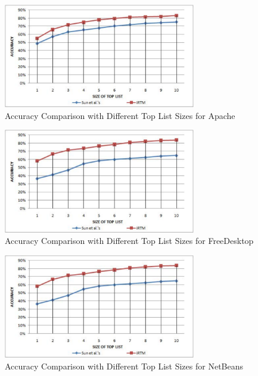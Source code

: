 \begin{figure}[t]
\centering
\includegraphics[width=3.3in]{apache}
\caption{Accuracy Comparison with Different Top List Sizes for Apache}
\label{apache}
\end{figure}


\begin{figure}[t]
\centering
\includegraphics[width=3.3in]{freedesktop}
\caption{Accuracy Comparison with Different Top List Sizes for FreeDesktop}
\label{freedesktop}
\end{figure}



\begin{figure}[t]
\centering
\includegraphics[width=3.3in]{freedesktop}
\caption{Accuracy Comparison with Different Top List Sizes for NetBeans}
\label{netbeans}
\end{figure}

